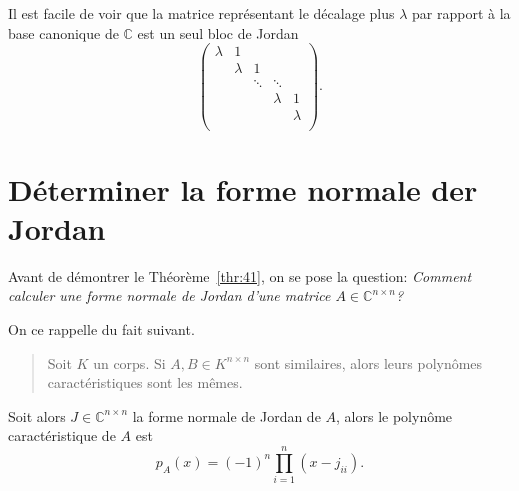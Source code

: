 Il est facile de voir que la matrice représentant le décalage plus $λ$ par rapport à la base canonique de $\mathbb{C}$ est 
un seul bloc de Jordan 
\begin{displaymath}
 \begin{pmatrix}
      λ & 1 \\
        & λ & 1 \\
        &   & \ddots & \ddots \\ 
        &   &             & λ & 1 \\
        &   &         &  & λ  \\
    \end{pmatrix}.   
\end{displaymath}




\section{Déterminer la forme normale der Jordan}
\label{sec:determiner-la-forme}

\noindent 
Avant de démontrer le Théorème~\ref{thr:41}, on se pose la question: \emph{Comment calculer une forme normale de Jordan d'une matrice $A ∈ ℂ^{n×n}$?}

On ce rappelle du fait suivant.
\begin{quote}
  Soit $K$ un corps. Si $A ,B ∈ K^{n ×n}$ sont similaires, alors leurs polynômes caractéristiques sont les mêmes. 
\end{quote}

\noindent 
Soit alors $J ∈ ℂ^{n ×n}$ la forme normale de Jordan de $A$, alors le polynôme caractéristique de $A$ est
\begin{equation}
  \label{eq:57}
  p_A(x) = (-1)^n ∏_{i=1}^n (x - j_{ii}). 
\end{equation}


